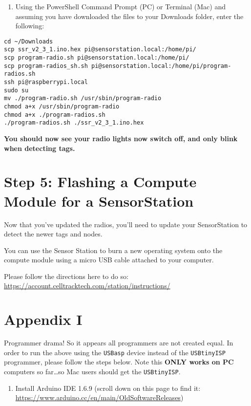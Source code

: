 \documentclass[
]{article}
\providecommand{\tightlist}{%
  \setlength{\itemsep}{0pt}\setlength{\parskip}{0pt}}
\begin{document}
\begin{enumerate}
\def\labelenumi{\arabic{enumi}.}
\setcounter{enumi}{2}
\tightlist
\item
  Using the PowerShell Command Prompt (PC) or Terminal (Mac) and
  assuming you have downloaded the files to your Downloads folder, enter
  the following:
\end{enumerate}

\begin{verbatim}
cd ~/Downloads
scp ssr_v2_3_1.ino.hex pi@sensorstation.local:/home/pi/
scp program-radio.sh pi@sensorstation.local:/home/pi/
scp program-radios_sh.sh pi@sensorstation.local:/home/pi/program-radios.sh
ssh pi@raspberrypi.local 
sudo su
mv ./program-radio.sh /usr/sbin/program-radio
chmod a+x /usr/sbin/program-radio
chmod a+x ./program-radios.sh
./program-radios.sh ./ssr_v2_3_1.ino.hex
\end{verbatim}

\textbf{You should now see your radio lights now switch off, and only
blink when detecting tags.}

\hypertarget{step-5-flashing-a-compute-module-for-a-sensorstation}{%
\section{Step 5: Flashing a Compute Module for a
SensorStation}\label{step-5-flashing-a-compute-module-for-a-sensorstation}}

Now that you've updated the radios, you'll need to update your
SensorStation to detect the newer tags and nodes.

You can use the Sensor Station to burn a new operating system onto the
compute module using a micro USB cable attached to your computer.

Please follow the directions here to do so:
\url{https://account.celltracktech.com/station/instructions/}

\hypertarget{Appendix_I}{%
\section{Appendix I}\label{Appendix_I}}

Programmer drama! So it appears all programmers are not created equal.
In order to run the above using the \texttt{USBasp} device instead of
the \texttt{USBtinyISP} programmer, please follow the steps below. Note
this \textbf{ONLY works on PC} computers so far\ldots so Mac users
should get the \texttt{USBtinyISP}.

\begin{enumerate}
\def\labelenumi{\arabic{enumi}.}
\tightlist
\item
  Install Arduino IDE 1.6.9 (scroll down on this page to find it:
  \url{https://www.arduino.cc/en/main/OldSoftwareReleases})
\end{enumerate}
\end{document}

